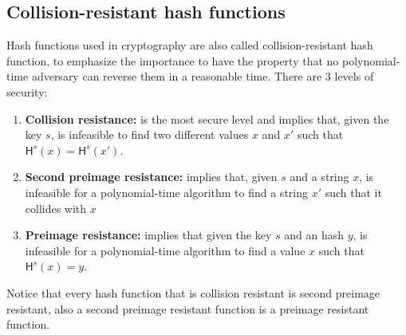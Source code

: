 \subsection{Collision-resistant hash functions}\label{sec:collisionresistant}
Hash functions used in cryptography are also called collision-resistant hash function, to emphasize the importance to have the property that no polynomial-time adversary can reverse them in a reasonable time.
There are 3 levels of security:
\begin{enumerate}
    \item{\textbf{Collision resistance:} is the most secure level and implies that, given the key $s$, is infeasible to find two different values $x$ and $x'$ such that $\mathsf{H}^s(x) = \mathsf{H}^s(x')$.}
    \item{\textbf{Second preimage resistance:} implies that, given $s$ and a string $x$, is infeasible for a polynomial-time algorithm to find a string $x'$ such that it collides with $x$}
    \item{\textbf{Preimage resistance:} implies that given the key $s$ and an hash $y$, is infeasible for a polynomial-time algorithm to find a value $x$ such that $\mathsf{H}^s(x) = y$.}
\end{enumerate}
Notice that every hash function that is collision resistant is second preimage resistant, also a second preimage resistant function is a preimage resistant function.

